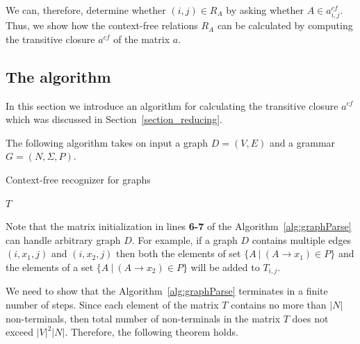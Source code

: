 We can, therefore, determine whether $(i,j) \in R_A$ by asking whether $A \in a^{cf}_{i,j}$. Thus, we show how the context-free relations $R_A$ can be calculated by computing the transitive closure $a^{cf}$ of the matrix $a$.



\subsection{The algorithm} \label{section_algorithm}
In this section we introduce an algorithm for calculating the transitive closure $a^{cf}$ which was discussed in Section~\ref{section_reducing}.

The following algorithm takes on input a graph $D = (V, E)$ and a grammar $G = (N,\Sigma,P)$.

\begin{algorithm}[H]
\begin{algorithmic}[1]
\caption{Context-free recognizer for graphs}
\label{alg:graphParse}
    
    \EndFor    
       
    \EndWhile
\State \Return $T$
\EndFunction
\end{algorithmic}
\end{algorithm}

Note that the matrix initialization in lines \textbf{6-7} of the Algorithm~\ref{alg:graphParse} can handle arbitrary graph $D$. For example, if a graph $D$ contains multiple edges $(i,x_1,j)$ and $(i,x_2,j)$ then both the elements of set $\{A~|~(A \rightarrow x_1) \in P \}$ and the elements of a set $\{A~|~(A \rightarrow x_2) \in P \}$ will be added to $T_{i,j}$.

We need to show that the Algorithm~\ref{alg:graphParse} terminates in a finite number of steps. Since each element of the matrix $T$ contains no more than $|N|$ non-terminals, then total number of non-terminals in the matrix $T$ does not exceed $|V|^2|N|$. Therefore, the following theorem holds.

